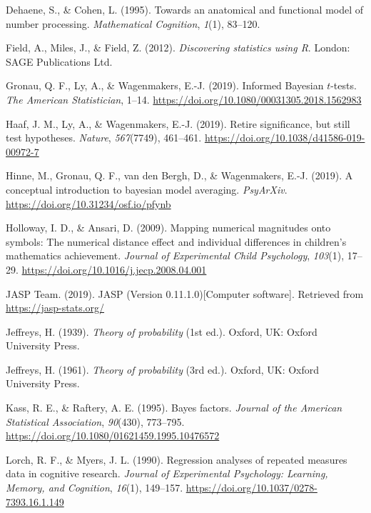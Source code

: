 \documentclass[english,,doc,floatsintext]{apa6}
\begin{document}
\leavevmode\hypertarget{ref-dehaeneCohen1995}{}%
Dehaene, S., \& Cohen, L. (1995). Towards an anatomical and functional model of number processing. \emph{Mathematical Cognition}, \emph{1}(1), 83--120.

\leavevmode\hypertarget{ref-field2012discovering}{}%
Field, A., Miles, J., \& Field, Z. (2012). \emph{Discovering statistics using R}. London: SAGE Publications Ltd.

\leavevmode\hypertarget{ref-gronau2019}{}%
Gronau, Q. F., Ly, A., \& Wagenmakers, E.-J. (2019). Informed Bayesian \(t\)-tests. \emph{The American Statistician}, 1--14. \url{https://doi.org/10.1080/00031305.2018.1562983}

\leavevmode\hypertarget{ref-haaf2019}{}%
Haaf, J. M., Ly, A., \& Wagenmakers, E.-J. (2019). Retire significance, but still test hypotheses. \emph{Nature}, \emph{567}(7749), 461--461. \url{https://doi.org/10.1038/d41586-019-00972-7}

\leavevmode\hypertarget{ref-hinneBMA}{}%
Hinne, M., Gronau, Q. F., van den Bergh, D., \& Wagenmakers, E.-J. (2019). A conceptual introduction to bayesian model averaging. \emph{PsyArXiv}. \url{https://doi.org/10.31234/osf.io/pfynb}

\leavevmode\hypertarget{ref-hollowayAnsari2009}{}%
Holloway, I. D., \& Ansari, D. (2009). Mapping numerical magnitudes onto symbols: The numerical distance effect and individual differences in children's mathematics achievement. \emph{Journal of Experimental Child Psychology}, \emph{103}(1), 17--29. \url{https://doi.org/10.1016/j.jecp.2008.04.001}

\leavevmode\hypertarget{ref-jaspSoftware}{}%
JASP Team. (2019). JASP (Version 0.11.1.0){[}Computer software{]}. Retrieved from \url{https://jasp-stats.org/}

\leavevmode\hypertarget{ref-jeffreys1939theory1}{}%
Jeffreys, H. (1939). \emph{Theory of probability} (1st ed.). Oxford, UK: Oxford University Press.

\leavevmode\hypertarget{ref-jeffreys1961}{}%
Jeffreys, H. (1961). \emph{Theory of probability} (3rd ed.). Oxford, UK: Oxford University Press.

\leavevmode\hypertarget{ref-kass1995}{}%
Kass, R. E., \& Raftery, A. E. (1995). Bayes factors. \emph{Journal of the American Statistical Association}, \emph{90}(430), 773--795. \url{https://doi.org/10.1080/01621459.1995.10476572}

\leavevmode\hypertarget{ref-lorch1990}{}%
Lorch, R. F., \& Myers, J. L. (1990). Regression analyses of repeated measures data in cognitive research. \emph{Journal of Experimental Psychology: Learning, Memory, and Cognition}, \emph{16}(1), 149--157. \url{https://doi.org/10.1037/0278-7393.16.1.149}
\end{document}
